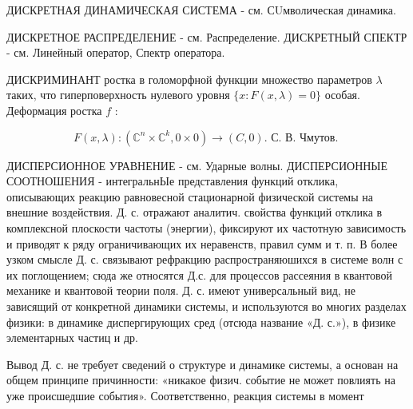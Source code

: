 \documentclass[10pt]{article}
\begin{document}
ДИСКРЕТНАЯ ДИНАМИЧЕСКАЯ СИСТЕМА - см. СUмволическая динамика.



ДИСКРЕТНОЕ РАСПРЕДЕЛЕНИЕ - см. Распределение. ДИСКРЕТНЫЙ СПЕКТР - см. Линейный оператор, Спектр оператора.



ДИСКРИМИНАНТ ростка в голоморфной функции множество параметров $\lambda$ таких, что гиперповерхность нулевого уровня $\{x: F(x, \lambda)=0\}$ особая. Деформация ростка $f$ :



\[

F(x, \lambda):\left(\mathbb{C}^{n} \times \mathbb{C}^{k}, 0 \times 0\right) \rightarrow(C, 0) \text {. С. В. Чмутов. }

\]



ДИСПЕРСИОННОЕ УРАВНЕНИЕ - см. Ударные волны. ДИСПЕРСИОННЫЕ СООТНОШЕНИЯ - интегральнЫе представления функций отклика, описывающих реакцию равновесной стационарной физической системы на внешние воздействия. Д. с. отражают аналитич. свойства функций отклика в комплексной плоскости частоты (энергии), фиксируют их частотную зависимость и приводят к ряду ограничивающих их неравенств, правил сумм и т. п. В более узком смысле Д. с. связывают рефракцию распространяюшихся в системе волн с их поглощением; сюда же относятся Д.с. для процессов рассеяния в квантовой механике и квантовой теории поля. Д. с. имеют универсальный вид, не зависящий от конкретной динамики системы, и используются во многих разделах физики: в динамике диспергирующих сред (отсюда название «Д. с.»), в физике элементарных частиц и др.



Вывод Д. с. не требует сведений о структуре и динамике системы, а основан на общем принципе причинности: «никакое физич. событие не может повлиять на уже происшедшие события». Соответственно, реакция системы в момент
\end{document}
